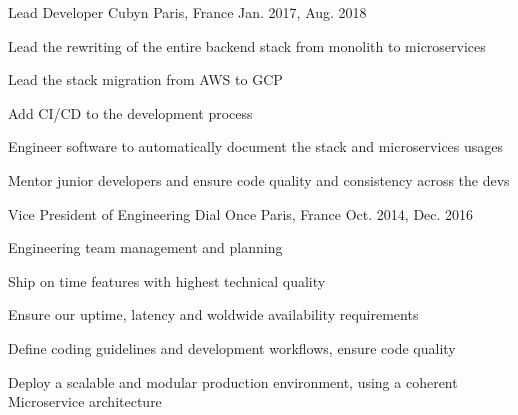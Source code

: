 

\begin{cventries}

  \cventry
    {Lead Developer} %
    {Cubyn} %
    {Paris, France} %
    {Jan. 2017, Aug. 2018} %
    {
      \begin{cvitems} %
        \item {Lead the rewriting of the entire backend stack from monolith to microservices}
        \item {Lead the stack migration from AWS to GCP}
        \item {Add CI/CD to the development process}
        \item {Engineer software to automatically document the stack and microservices usages}
        \item {Mentor junior developers and ensure code quality and consistency across the devs}
      \end{cvitems}
    }

  \cventry
    {Vice President of Engineering} %
    {Dial Once} %
    {Paris, France} %
    {Oct. 2014, Dec. 2016} %
    {
      \begin{cvitems} %
        \item {Engineering team management and planning}
        \item {Ship on time features with highest technical quality}
        \item {Ensure our uptime, latency and woldwide availability requirements}
        \item {Define coding guidelines and development workflows, ensure code quality}
        \item {Deploy a scalable and modular production environment, using a coherent Microservice architecture}
      \end{cvitems}
    }


\end{cventries}
